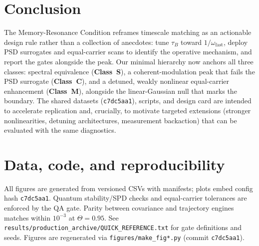 \documentclass[11pt,letterpaper]{article}
\newcommand{\confighash}{c7dc5aa1}
\DeclareRobustCommand{\classS}{\textbf{Class~S}\xspace}
\DeclareRobustCommand{\classC}{\textbf{Class~C}\xspace}
\DeclareRobustCommand{\classM}{\textbf{Class~M}\xspace}
\begin{document}
\section{Conclusion}
The Memory-Resonance Condition reframes timescale matching as an actionable design rule rather than a collection of anecdotes: tune $\tau_B$ toward $1/\omega_{\mathrm{fast}}$, deploy PSD surrogates and equal-carrier scans to identify the operative mechanism, and report the gates alongside the peak. Our minimal hierarchy now anchors all three classes: spectral equivalence (\classS{}), a coherent-modulation peak that fails the PSD surrogate (\classC{}), and a detuned, weakly nonlinear equal-carrier enhancement (\classM{}), alongside the linear-Gaussian null that marks the boundary. The shared datasets (\texttt{\confighash}), scripts, and design card are intended to accelerate replication and, crucially, to motivate targeted extensions (stronger nonlinearities, detuning architectures, measurement backaction) that can be evaluated with the same diagnostics.

\section*{Data, code, and reproducibility}
All figures are generated from versioned CSVs with manifests; plots embed config hash \texttt{\confighash}. Quantum stability/SPD checks and equal-carrier tolerances are enforced by the QA gate. Parity between covariance and trajectory engines matches within $10^{-3}$ at $\Theta=0.95$. See \texttt{results/\allowbreak production\_archive/\allowbreak QUICK\_REFERENCE.txt} for gate definitions and seeds. Figures are regenerated via \texttt{figures/\allowbreak make\_fig*.py} (commit \texttt{\confighash}).
\end{document}
